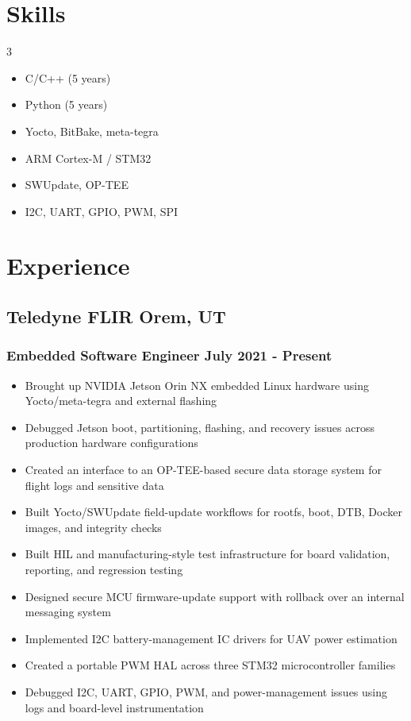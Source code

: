 \documentclass[11pt]{article} %
\begin{document}
\section{Skills}
\setlength{\multicolsep}{0pt} %
\begin{multicols}{3}
	\begin{itemize}
		\item C/C++ (5 years)
		\item Python (5 years)
		\item Yocto, BitBake, meta-tegra
		\item ARM Cortex-M / STM32
		\item SWUpdate, OP-TEE
		\item I2C, UART, GPIO, PWM, SPI
	\end{itemize}
\end{multicols}

\section{Experience}
\subsection{Teledyne FLIR \hfill Orem, UT}
\subsubsection{Embedded Software Engineer \hfill  July 2021 - Present}
\begin{itemize}
	\item Brought up NVIDIA Jetson Orin NX embedded Linux hardware using Yocto/meta-tegra and external flashing
	\item Debugged Jetson boot, partitioning, flashing, and recovery issues across production hardware configurations
	\item Created an interface to an OP-TEE-based secure data storage system for flight logs and sensitive data
	\item Built Yocto/SWUpdate field-update workflows for rootfs, boot, DTB, Docker images, and integrity checks
	\item Built HIL and manufacturing-style test infrastructure for board validation, reporting, and regression testing
	\item Designed secure MCU firmware-update support with rollback over an internal messaging system
	\item Implemented I2C battery-management IC drivers for UAV power estimation
	\item Created a portable PWM HAL across three STM32 microcontroller families
	\item Debugged I2C, UART, GPIO, PWM, and power-management issues using logs and board-level instrumentation
\end{itemize}
\end{document}
